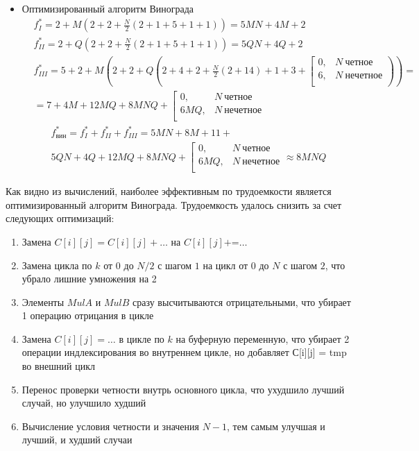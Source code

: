 \documentclass[a4paper,12pt]{report}
\begin{document}
\begin{itemize}
\item Оптимизированный алгоритм Винограда
\begin{align*}
& f_{I}^{*} = 2 + M(2 + 2 + \frac{N}{2} (2 + 1 + 5 + 1 + 1)) =  5MN + 4M + 2\\
& f_{II}^{*} =  2 + Q(2 + 2 + \frac{N}{2} (2 + 1 + 5 + 1 + 1)) =  5QN + 4Q + 2\\
& f_{III}^{*} = 5 + 2 + M(2 + 2 + Q(2 + 4 + 2 + \frac{N}{2}(2 + 14) + 1 + 3 + \left[
	\begin{array}{ccc}
     0, & N \ четное \\
     6,  & N \ нечетное \\
  \end{array}
  \right.)) = \\ 
  & = 7 + 4M + 12MQ + 8MNQ + \left[
	\begin{array}{ccc}
     0, & N \ четное \\
     6MQ,  & N \ нечетное \\
  \end{array}
  \right.
\end{align*}
\begin{multline*} 
f_{вин}^{*} = f_{I}^{*} + f_{II}^{*} + f_{III}^{*} = 5MN + 8M + 11 + \\5QN + 4Q + 12MQ + 8MNQ + \left[
	\begin{array}{ccc}
     0, & N \ четное \\
     6MQ,  & N \ нечетное \\
  \end{array}
  \right. \approx 8MNQ
\end{multline*}
\end{itemize}

Как видно из вычислений, наиболее эффективным по трудоемкости является оптимизированный алгоритм Винограда. 
\newpage
Трудоемкость удалось снизить за счет следующих оптимизаций:
\begin{enumerate}
\item Замена $C[i][j] = C[i][j] + \ldots$ на $C[i][j] \text{+=} \ldots$
\item Замена цикла по $k$ от $0$ до $N/2$ с шагом $1$ на цикл от $0$ до $N$ с шагом $2$, что убрало лишние умножения на 2
\item Элементы $MulA$ и $MulB$ сразу высчитываются отрицательными, что убирает 1 операцию отрицания в цикле
\item Замена $C[i][j] = \ldots$ в цикле по $k$ на буферную переменную, что убирает 2 операции индлексирования во внутреннем цикле, но добавляет С[i][j] = tmp во внешний цикл
\item Перенос проверки четности внутрь основного цикла, что ухудшило лучший случай, но улучшило худший
\item Вычисление условия четности и значения $N-1$, тем самым улучшая и лучший, и худший случаи
\end{enumerate}
\end{document}

